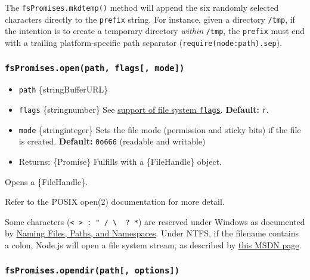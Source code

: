 The \texttt{fsPromises.mkdtemp()} method will append the six randomly
selected characters directly to the \texttt{prefix} string. For
instance, given a directory \texttt{/tmp}, if the intention is to create
a temporary directory \emph{within} \texttt{/tmp}, the \texttt{prefix}
must end with a trailing platform-specific path separator
(\texttt{require(\textquotesingle{}node:path\textquotesingle{}).sep}).

\subsubsection{\texorpdfstring{\texttt{fsPromises.open(path,\ flags{[},\ mode{]})}}{fsPromises.open(path, flags{[}, mode{]})}}\label{fspromises.openpath-flags-mode}

\begin{itemize}
\tightlist
\item
  \texttt{path} \{string\textbar Buffer\textbar URL\}
\item
  \texttt{flags} \{string\textbar number\} See
  \hyperref[file-system-flags]{support of file system \texttt{flags}}.
  \textbf{Default:} \texttt{\textquotesingle{}r\textquotesingle{}}.
\item
  \texttt{mode} \{string\textbar integer\} Sets the file mode
  (permission and sticky bits) if the file is created. \textbf{Default:}
  \texttt{0o666} (readable and writable)
\item
  Returns: \{Promise\} Fulfills with a \{FileHandle\} object.
\end{itemize}

Opens a \{FileHandle\}.

Refer to the POSIX open(2) documentation for more detail.

Some characters
(\texttt{\textless{}\ \textgreater{}\ :\ "\ /\ \textbackslash{}\ \textbar{}\ ?\ *})
are reserved under Windows as documented by
\href{https://docs.microsoft.com/en-us/windows/desktop/FileIO/naming-a-file}{Naming
Files, Paths, and Namespaces}. Under NTFS, if the filename contains a
colon, Node.js will open a file system stream, as described by
\href{https://docs.microsoft.com/en-us/windows/desktop/FileIO/using-streams}{this
MSDN page}.

\subsubsection{\texorpdfstring{\texttt{fsPromises.opendir(path{[},\ options{]})}}{fsPromises.opendir(path{[}, options{]})}}\label{fspromises.opendirpath-options}

